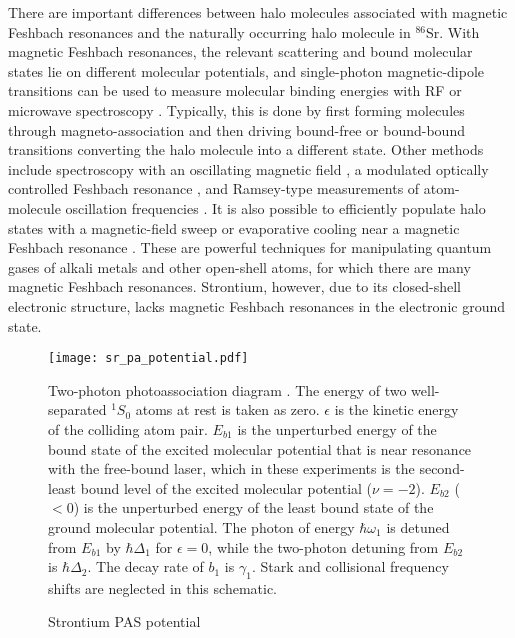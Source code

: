 
There are important differences between halo molecules associated with magnetic Feshbach resonances and the naturally occurring halo molecule in $^{86}$Sr. With magnetic Feshbach resonances, the relevant scattering and bound molecular states lie on different molecular potentials, and single-photon magnetic-dipole transitions can be used to measure molecular binding energies with RF or microwave spectroscopy \cite{cgj10,cju05,thw05b}. Typically, this is done by first forming molecules through magneto-association and then driving bound-free or bound-bound transitions converting the halo molecule into a different state. Other methods include spectroscopy with an oscillating magnetic field \cite{thw05b}, a modulated optically controlled Feshbach resonance \cite{chx15}, and Ramsey-type measurements of atom-molecule oscillation frequencies \cite{ckt03}. It is also possible to efficiently populate halo states with a magnetic-field sweep \cite{grj03} or evaporative cooling \cite{jba03} near a magnetic Feshbach resonance \cite{cgj10}. These are powerful techniques for manipulating quantum gases of alkali metals and other open-shell atoms, for which there are many magnetic Feshbach resonances. Strontium, however, due to its closed-shell electronic structure, lacks magnetic Feshbach resonances in the electronic ground state.


\begin{figure} \label{fig:PASDiagram}
\centerline{
  \texttt{[image: sr\_pa\_potential.pdf]}}
  \caption{Strontium PAS potential}{Two-photon photoassociation diagram . The energy of two well-separated $^1S_0$ atoms at rest is taken as zero. $\epsilon$ is the kinetic energy of the colliding atom pair. $E_{b1}$ is the unperturbed energy of the bound state of the excited molecular potential that is near resonance with the free-bound laser, which in these experiments is the second-least bound level of the excited molecular potential ($\nu=-2$). $E_{b2}$ ($<0$) is the unperturbed energy of the least bound state of the ground molecular potential. The photon of energy $\hbar \omega_1$ is detuned from $E_{b1}$ by $\hbar \Delta_1$ for $\epsilon=0$, while the two-photon detuning from $E_{b2}$ is $\hbar \Delta_2$. The decay rate of $b_1$ is $\gamma_1$. Stark and collisional frequency shifts are neglected in this schematic.}
  
\end{figure}


